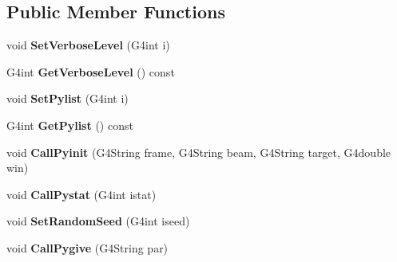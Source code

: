 \subsection*{Public Member Functions}
\begin{DoxyCompactItemize}
\item 
\hypertarget{class_hep_m_c_g4_pythia_interface_a6bebc88001f05ded58041b4f0426926f}{}void {\bfseries Set\+Verbose\+Level} (G4int i)\label{class_hep_m_c_g4_pythia_interface_a6bebc88001f05ded58041b4f0426926f}

\item 
\hypertarget{class_hep_m_c_g4_pythia_interface_abf6c19f7c69d397cef873502ae387531}{}G4int {\bfseries Get\+Verbose\+Level} () const \label{class_hep_m_c_g4_pythia_interface_abf6c19f7c69d397cef873502ae387531}

\item 
\hypertarget{class_hep_m_c_g4_pythia_interface_a5cf44f1b169369fed4a0456901867c2d}{}void {\bfseries Set\+Pylist} (G4int i)\label{class_hep_m_c_g4_pythia_interface_a5cf44f1b169369fed4a0456901867c2d}

\item 
\hypertarget{class_hep_m_c_g4_pythia_interface_a41f2d519af2273d7b99b5eb62e67894d}{}G4int {\bfseries Get\+Pylist} () const \label{class_hep_m_c_g4_pythia_interface_a41f2d519af2273d7b99b5eb62e67894d}

\item 
\hypertarget{class_hep_m_c_g4_pythia_interface_a5b8d73fc3d65b4539cfca4168101ce14}{}void {\bfseries Call\+Pyinit} (G4\+String frame, G4\+String beam, G4\+String target, G4double win)\label{class_hep_m_c_g4_pythia_interface_a5b8d73fc3d65b4539cfca4168101ce14}

\item 
\hypertarget{class_hep_m_c_g4_pythia_interface_a7f853e52f16a3fba0265380932c9cf43}{}void {\bfseries Call\+Pystat} (G4int istat)\label{class_hep_m_c_g4_pythia_interface_a7f853e52f16a3fba0265380932c9cf43}

\item 
\hypertarget{class_hep_m_c_g4_pythia_interface_a609e892870a9592cdea8be836c21573c}{}void {\bfseries Set\+Random\+Seed} (G4int iseed)\label{class_hep_m_c_g4_pythia_interface_a609e892870a9592cdea8be836c21573c}

\item 
\hypertarget{class_hep_m_c_g4_pythia_interface_ae8163e7f051487ed2284dd89d0c6890d}{}void {\bfseries Call\+Pygive} (G4\+String par)\label{class_hep_m_c_g4_pythia_interface_ae8163e7f051487ed2284dd89d0c6890d}


\end{DoxyCompactItemize}
